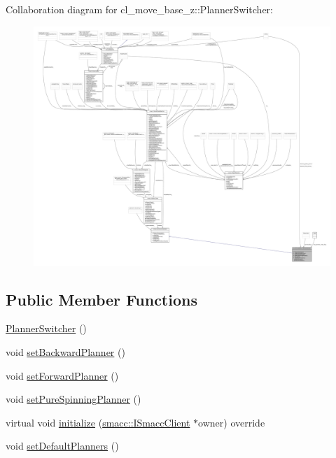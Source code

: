 Collaboration diagram for cl\+\_\+move\+\_\+base\+\_\+z\+:\+:Planner\+Switcher\+:
\nopagebreak
\begin{figure}[H]
\begin{center}
\leavevmode
\includegraphics[width=350pt]{classcl__move__base__z_1_1PlannerSwitcher__coll__graph}
\end{center}
\end{figure}
\subsection*{Public Member Functions}
\begin{DoxyCompactItemize}
\item 
\hyperlink{classcl__move__base__z_1_1PlannerSwitcher_aacdf8266ba7dc861efd460645587561f}{Planner\+Switcher} ()
\item 
void \hyperlink{classcl__move__base__z_1_1PlannerSwitcher_a6995deff44418a0965e4e793de8c4857}{set\+Backward\+Planner} ()
\item 
void \hyperlink{classcl__move__base__z_1_1PlannerSwitcher_a4bec9859c90f125f9fcc2b68594caf17}{set\+Forward\+Planner} ()
\item 
void \hyperlink{classcl__move__base__z_1_1PlannerSwitcher_a0accdff89d7858658c1835f06b53786f}{set\+Pure\+Spinning\+Planner} ()
\item 
virtual void \hyperlink{classcl__move__base__z_1_1PlannerSwitcher_a8180bda19d3fdc2bcb3d9792002cd325}{initialize} (\hyperlink{classsmacc_1_1ISmaccClient}{smacc\+::\+I\+Smacc\+Client} $\ast$owner) override
\item 
void \hyperlink{classcl__move__base__z_1_1PlannerSwitcher_ad3f0d08a51af6218d203bf44a7f9df40}{set\+Default\+Planners} ()
\end{DoxyCompactItemize}
